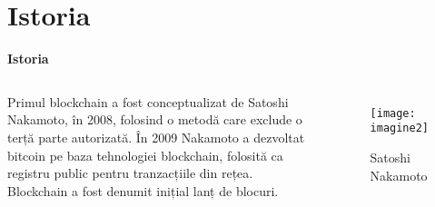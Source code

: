 \documentclass[black]{beamer}
\begin{document}
\section{Istoria}
\begin{frame}
	\begin{block}{\textbf{Istoria}}
		
		
		\begin{columns}[onlytextwidth,T]
			\column{\dimexpr\linewidth-25mm-9mm}
			Primul blockchain a fost conceptualizat de Satoshi Nakamoto, în 2008, folosind o metodă care exclude o terță parte autorizată. În 2009 Nakamoto a dezvoltat bitcoin pe baza tehnologiei blockchain, folosită ca registru public pentru tranzacțiile din rețea.
		   	Blockchain a fost denumit inițial lanț de blocuri.	
			\column{30mm}
		\begin{figure}[h]
			\centering
			\texttt{[image: imagine2]}
			\caption[Satoshi Nakamoto]{Satoshi Nakamoto}
			\label{imagine2}
		\end{figure}
		
			
			
		\end{columns}
	\end{block}
\end{frame}
\end{document}
